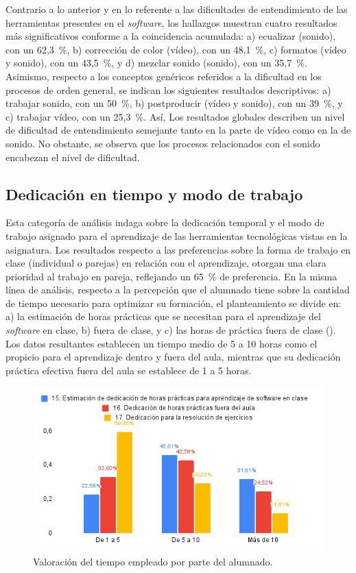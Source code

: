 \documentclass[spanish]{textolivre}
\begin{document}
Contrario a lo anterior y en lo referente a las dificultades de entendimiento de las herramientas presentes en el \textit{software}, los hallazgos muestran cuatro resultados más significativos conforme a la coincidencia acumulada: a) ecualizar (sonido), con un 62,3~\%, b) corrección de color (vídeo), con un 48,1~\%, c) formatos (vídeo y sonido), con un 43,5~\%, y d) mezclar sonido (sonido), con un 35,7~\%. Asimismo, respecto a los conceptos genéricos referidos a la dificultad en los procesos de orden general, se indican los siguientes resultados descriptivos: a) trabajar sonido, con un 50~\%, b) postproducir (vídeo y sonido), con un 39~\%, y c) trabajar vídeo, con un 25,3~\%. Así, Los resultados globales describen un nivel de dificultad de entendimiento semejante tanto en la parte de vídeo como en la de sonido. No obstante, se observa que los procesos relacionados con el sonido encabezan el nivel de dificultad.

\subsection{Dedicación en tiempo y modo de trabajo}\label{sec-resumo}
Esta categoría de análisis indaga sobre la dedicación temporal y el modo de trabajo asignado para el aprendizaje de las herramientas tecnológicas vistas en la asignatura. Los resultados respecto a las preferencias sobre la forma de trabajo en clase (individual o parejas) en relación con el aprendizaje, otorgan una clara prioridad al trabajo en pareja, reflejando un 65~\% de preferencia. En la misma línea de análisis, respecto a la percepción que el alumnado tiene sobre la cantidad de tiempo necesario para optimizar su formación, el planteamiento se divide en: a) la estimación de horas prácticas que se necesitan para el aprendizaje del \textit{software} en clase, b) fuera de clase, y c) las horas de práctica fuera de clase (). Los datos resultantes establecen un tiempo medio de 5 a 10 horas como el propicio para el aprendizaje dentro y fuera del aula, mientras que su dedicación práctica efectiva fuera del aula se establece de 1 a 5 horas.

\begin{figure}[h!]
\centering
\begin{minipage}{.8\textwidth}
\includegraphics[width=0.8\linewidth]{Fig2.png}
\caption{Valoración del tiempo empleado por parte del alumnado.}
\label{fig2}
\end{minipage}
\end{figure}
\end{document}
